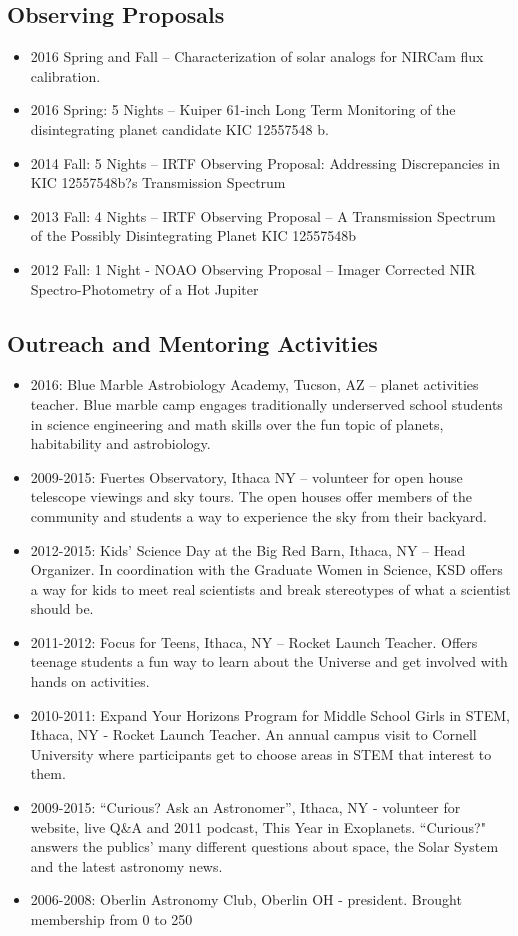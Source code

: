 \documentclass[11pt, oneside]{article}   	%
\begin{document}
\subsection*{Observing Proposals}
\begin{itemize}[noitemsep]
    \item 2016 Spring and Fall -- Characterization of solar analogs for NIRCam flux calibration.
    \item 2016 Spring: 5 Nights -- Kuiper 61-inch Long Term Monitoring of the disintegrating planet candidate KIC 12557548 b.
    \item 2014 Fall: 5 Nights -- IRTF Observing Proposal: Addressing Discrepancies in KIC 12557548b?s Transmission Spectrum
    \item 2013 Fall: 4 Nights -- IRTF Observing Proposal -- A Transmission Spectrum of the Possibly Disintegrating Planet KIC 12557548b
    \item 2012 Fall: 1 Night - NOAO Observing Proposal -- Imager Corrected NIR Spectro-Photometry of a Hot Jupiter
\end{itemize}

\subsection*{Outreach and Mentoring Activities}
\begin{itemize}[noitemsep]
    \item 2016: Blue Marble Astrobiology Academy, Tucson, AZ -- planet activities teacher. Blue marble camp engages traditionally underserved school students in science engineering and math skills over the fun topic of planets, habitability and astrobiology.
    \item 2009-2015: Fuertes Observatory, Ithaca NY -- volunteer for open house telescope viewings and sky tours. The open houses offer members of the community and students a way to experience the sky from their backyard.
    \item 2012-2015: Kids' Science Day at the Big Red Barn, Ithaca, NY -- Head Organizer. In coordination with the Graduate Women in Science, KSD offers a way for kids to meet real scientists and break stereotypes of what a scientist should be.
    \item 2011-2012: Focus for Teens, Ithaca, NY -- Rocket Launch Teacher. Offers teenage students a fun way to learn about the Universe and get involved with hands on activities.
    \item 2010-2011: Expand Your Horizons Program for Middle School Girls in STEM, Ithaca, NY - Rocket Launch Teacher. An annual campus visit to Cornell University where participants get to choose areas in STEM that interest to them.
    \item 2009-2015: ``Curious? Ask an Astronomer'', Ithaca, NY - volunteer for website, live Q\&A and 2011 podcast, This Year in Exoplanets. ``Curious?" answers the publics' many different questions about space, the Solar System and the latest astronomy news.
    \item 2006-2008: Oberlin Astronomy Club, Oberlin OH - president. Brought membership from 0 to 250
 \end{itemize}
\end{document}
